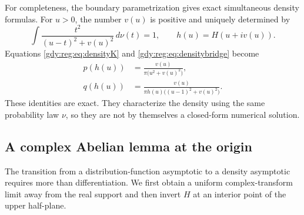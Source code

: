 \documentclass[11pt]{article}
\numberwithin{equation}{section}
\theoremstyle{definition}
\theoremstyle{remark}
\begin{document}
For completeness, the boundary parametrization gives exact simultaneous
density formulas.  For $u>0$, the number $v(u)$ is positive and uniquely
determined by
\begin{equation}\label{gdy:reg:eq:boundaryequation}
 \int\frac{t^2}{(u-t)^2+v(u)^2}\,d\nu(t)=1,
 \qquad h(u)=H(u+iv(u)).
\end{equation}
Equations \eqref{gdy:reg:eq:densityK} and \eqref{gdy:reg:eq:densitybridge} become
\begin{equation}\label{gdy:reg:eq:parametricdensities}
 \begin{split}
 p(h(u))&=\frac{v(u)}{\pi\bigl(u^2+v(u)^2\bigr)},\\
 q(h(u))&=\frac{v(u)}{
       \pi h(u)\bigl((u-1)^2+v(u)^2\bigr)}.
 \end{split}
\end{equation}
These identities are exact.  They characterize the density using the
same probability law $\nu$, so they are not by themselves a closed-form
numerical solution.

\subsection{A complex Abelian lemma at the origin}
\label{gdy:reg:subsec:abelian}

The transition from a distribution-function asymptotic to a density
asymptotic requires more than differentiation.  We first obtain a
uniform complex-transform limit away from the real support and then
invert $H$ at an interior point of the upper half-plane.
\end{document}
